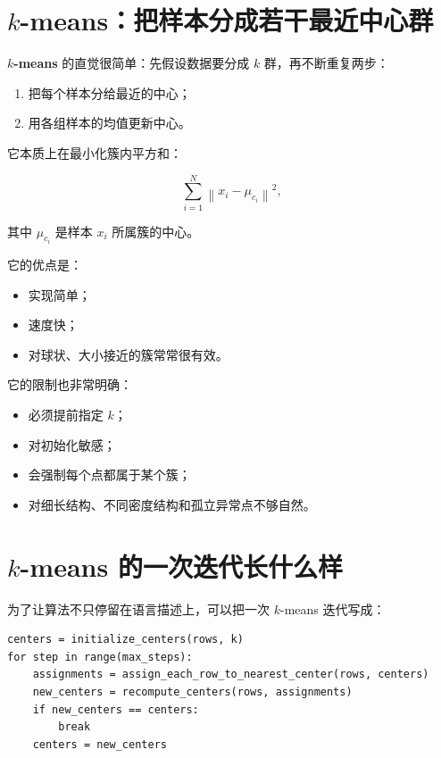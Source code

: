 \section{\texorpdfstring{$k$-means}{k-means}：把样本分成若干最近中心群}

\textbf{$k$-means} 的直觉很简单：先假设数据要分成 $k$ 群，再不断重复两步：

\begin{enumerate}
    \item 把每个样本分给最近的中心；
    \item 用各组样本的均值更新中心。
\end{enumerate}

它本质上在最小化簇内平方和：

\[
\sum_{i=1}^{N}
\left\|x_i - \mu_{c_i}\right\|^2,
\]

其中 $\mu_{c_i}$ 是样本 $x_i$ 所属簇的中心。

它的优点是：

\begin{itemize}
    \item 实现简单；
    \item 速度快；
    \item 对球状、大小接近的簇常常很有效。
\end{itemize}

它的限制也非常明确：

\begin{itemize}
    \item 必须提前指定 $k$；
    \item 对初始化敏感；
    \item 会强制每个点都属于某个簇；
    \item 对细长结构、不同密度结构和孤立异常点不够自然。
\end{itemize}

\section{\texorpdfstring{$k$-means}{k-means} 的一次迭代长什么样}

为了让算法不只停留在语言描述上，可以把一次 $k$-means 迭代写成：

\begin{examplebox}
\begin{lstlisting}[style=pythonstyle]
centers = initialize_centers(rows, k)
for step in range(max_steps):
    assignments = assign_each_row_to_nearest_center(rows, centers)
    new_centers = recompute_centers(rows, assignments)
    if new_centers == centers:
        break
    centers = new_centers
\end{lstlisting}
\end{examplebox}

